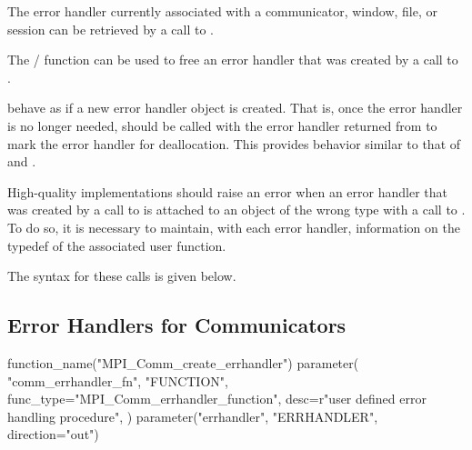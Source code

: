 The error handler currently associated with a communicator, window, file, or session
can be retrieved by a call to .

The \mpi/ function  can be used to free an
error handler that was created by a call to
.
 
%
%
%
%
 behave as if a
new error handler object is created.
That is, once the error handler is no longer needed,
 should be called with the error handler returned
from
to mark the error handler for deallocation.
This provides behavior similar to that of  and
.

\begin{implementors}
High-quality implementations should raise an error when an error handler
that
%
%
%
%
was created by a call to  is
attached to an object of the wrong type with a call to
.  To do so, it is necessary to
maintain, with each error handler, information on the typedef of the
associated user function.
\end{implementors}

The syntax for these calls is given below.





\subsection{Error Handlers for Communicators}
\label{subsec:inquiry-errhdlr-comm}

%
\begin{mpi-binding}
    function_name("MPI_Comm_create_errhandler")
    parameter(
        "comm_errhandler_fn",
        "FUNCTION",
        func_type="MPI_Comm_errhandler_function",
        desc=r"user defined error handling procedure",
    )
    parameter("errhandler", "ERRHANDLER", direction="out")
\end{mpi-binding}

